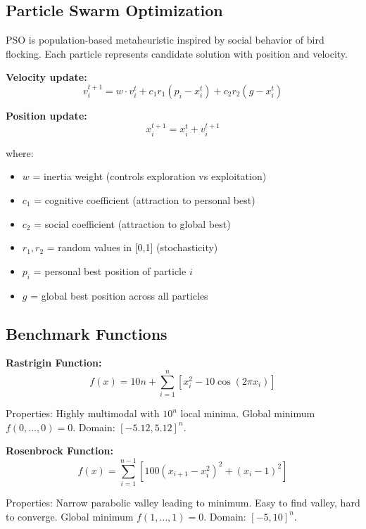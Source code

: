 \documentclass[letterpaper]{article}
\begin{document}
\subsection{Particle Swarm Optimization}

PSO is population-based metaheuristic inspired by social behavior of bird flocking. Each particle represents candidate solution with position and velocity.

\textbf{Velocity update:}
\begin{equation}
v_i^{t+1} = w \cdot v_i^t + c_1 r_1 (p_i - x_i^t) + c_2 r_2 (g - x_i^t)
\end{equation}

\textbf{Position update:}
\begin{equation}
x_i^{t+1} = x_i^t + v_i^{t+1}
\end{equation}

where:
\begin{itemize}
\item $w$ = inertia weight (controls exploration vs exploitation)
\item $c_1$ = cognitive coefficient (attraction to personal best)
\item $c_2$ = social coefficient (attraction to global best)
\item $r_1, r_2$ = random values in [0,1] (stochasticity)
\item $p_i$ = personal best position of particle $i$
\item $g$ = global best position across all particles
\end{itemize}

\subsection{Benchmark Functions}

\textbf{Rastrigin Function:}
\begin{equation}
f(x) = 10n + \sum_{i=1}^n [x_i^2 - 10\cos(2\pi x_i)]
\end{equation}

Properties: Highly multimodal with $10^n$ local minima. Global minimum $f(0,\ldots,0) = 0$. Domain: $[-5.12, 5.12]^n$.

\textbf{Rosenbrock Function:}
\begin{equation}
f(x) = \sum_{i=1}^{n-1} [100(x_{i+1} - x_i^2)^2 + (x_i - 1)^2]
\end{equation}

Properties: Narrow parabolic valley leading to minimum. Easy to find valley, hard to converge. Global minimum $f(1,\ldots,1) = 0$. Domain: $[-5, 10]^n$.
\end{document}
